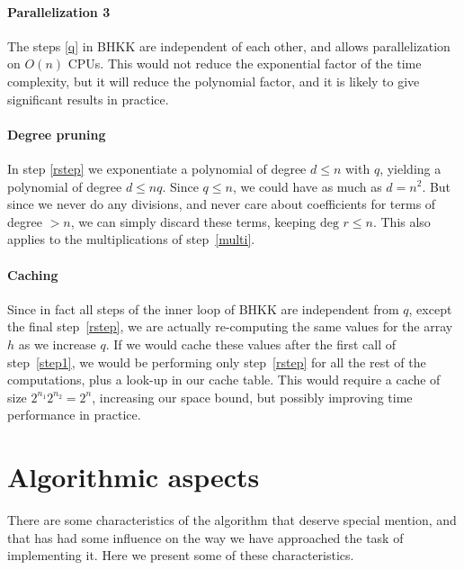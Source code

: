 \documentclass{cslthse-msc}
\begin{document}
\paragraph{Parallelization 3} The steps \ref{q} in BHKK are independent of each other, and allows parallelization on $O(n)$ CPUs. This would not reduce the exponential factor of the time complexity, but it will reduce the polynomial factor, and it is likely to give significant results in practice.

\paragraph{Degree pruning} In step \ref{rstep} we exponentiate a polynomial of degree $d \leq n$ with $q$, yielding a polynomial of degree $d \leq nq$. Since $q \leq n$, we could have as much as $d = n^2$. But since we never do any divisions, and never care about coefficients for terms of degree $> n$, we can simply discard these terms, keeping $\text{deg } r \leq n$. This also applies to the multiplications of step~\ref{multi}.

\paragraph{Caching} Since in fact all steps of the inner loop of BHKK are independent from $q$, except the final step~\ref{rstep}, we are actually re-computing the same values for the array $h$ as we increase $q$. If we would cache these values after the first call of step~\ref{step1}, we would be performing only step~\ref{rstep} for all the rest of the computations, plus a look-up in our cache table. This would require a cache of size $2^{n_1} 2^{n_2} = 2^n$, increasing our space bound, but possibly improving time performance in practice.


\section{Algorithmic aspects}
There are some characteristics of the algorithm that deserve special mention, and that has had some influence on the way we have approached the task of implementing it. Here we present some of these characteristics.
\end{document}
